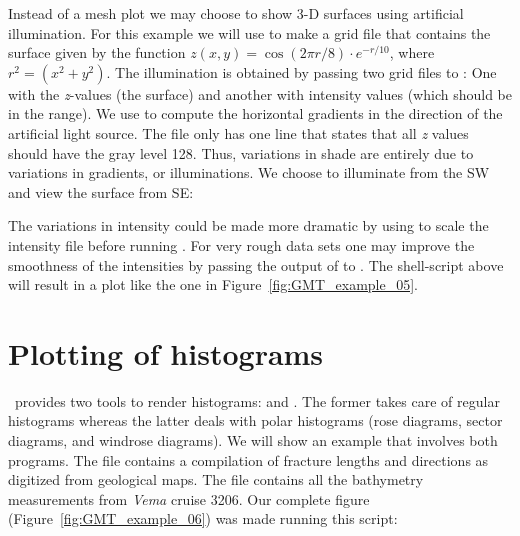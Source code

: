 Instead of a mesh plot we may choose to show 3-D surfaces using
artificial illumination.  For this example we will use
 to make a grid file that contains the surface given
by the function $z(x, y) = \cos (2\pi r/8)\cdot e^{-r/10}$, where
$r^2 = (x^2 + y^2)$.  The illumination is obtained by passing
two grid files to : One with the {\it z}-values
(the surface) and another with intensity values (which should
be in the  range).  We use  to compute
the horizontal gradients in the direction of the artificial
light source.  The  file only has one line that states
that all {\it z} values should have the gray level 128.  Thus,
variations in shade are entirely due to variations in gradients,
or illuminations.  We choose to illuminate from the SW and view
the surface from SE:


The variations in intensity could be made more dramatic by
using  to scale the intensity file before
running .  For very rough data sets one may
improve the smoothness of the intensities by passing the
output of  to .  The
shell-script above will result in a plot like the one in
Figure~\ref{fig:GMT_example_05}.



\section{Plotting of histograms}

\GMT\ provides two tools to render histograms: 
and .  The former takes care of regular histograms
whereas the latter deals with polar histograms (rose diagrams,
sector diagrams, and windrose diagrams).  We will show an
example that involves both programs.  The file 
contains a compilation of fracture lengths and directions as
digitized from geological maps.  The file  contains
all the bathymetry measurements from {\it Vema} cruise 3206.
Our complete figure (Figure~\ref{fig:GMT_example_06}) was made running
this script:




